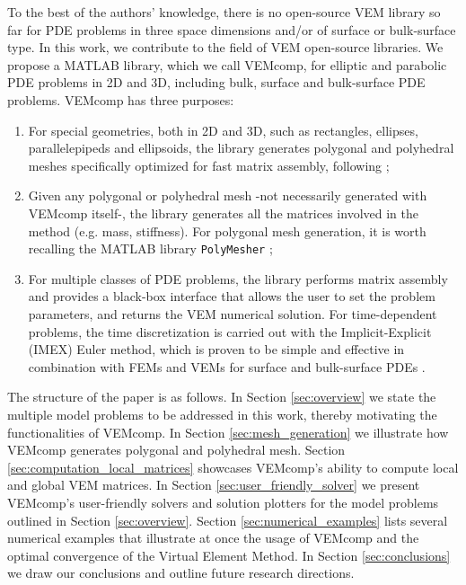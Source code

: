 \documentclass[a4paper]{article}
\begin{document}
{To the best of the authors' knowledge, there is no open-source VEM library so far for PDE problems in three space dimensions and/or of surface or bulk-surface type. In this work,  we contribute to the field of VEM open-source libraries. We propose a MATLAB library,  which we call VEMcomp, for elliptic and parabolic PDE problems in 2D and 3D, including bulk, surface and bulk-surface PDE problems.  VEMcomp has three purposes:
\begin{enumerate}
\item For special geometries, both in 2D and 3D, such as rectangles, ellipses, parallelepipeds and ellipsoids, the library generates polygonal and polyhedral meshes specifically optimized for fast matrix assembly, following \cite{frittelli2021bulk, frittelli2023bsrds};
\item Given any polygonal or polyhedral mesh -not necessarily generated with VEMcomp itself-, the library generates all the matrices involved in the method (e.g. mass, stiffness).  For polygonal mesh generation, it is worth recalling the MATLAB library \texttt{PolyMesher} \cite{Talischi_2012};
\item For multiple classes of PDE problems,  the library performs matrix assembly and provides a black-box interface that allows the user to set the problem parameters, and returns the VEM numerical solution. For time-dependent problems, the time discretization is carried out with the Implicit-Explicit (IMEX) Euler method,  which is proven to be simple and effective in combination with FEMs and VEMs for surface \cite{Frittelli2017preserving, Frittelli2017cross} and bulk-surface PDEs \cite{frittelli2021bulk, frittelli2023bsrds}.
\end{enumerate}
%
The structure of the paper is as follows. In Section \ref{sec:overview} we state the multiple model problems to be addressed in this work, thereby motivating the functionalities of VEMcomp.  In Section \ref{sec:mesh_generation} we illustrate how VEMcomp generates polygonal and polyhedral mesh. Section \ref{sec:computation_local_matrices} showcases VEMcomp's ability to compute local and global VEM matrices. In Section \ref{sec:user_friendly_solver} we present VEMcomp's user-friendly solvers and solution plotters for the model problems outlined in Section \ref{sec:overview}.  Section \ref{sec:numerical_examples} lists several numerical examples that illustrate at once the usage of VEMcomp and the optimal convergence of the Virtual Element Method. In Section \ref{sec:conclusions} we draw our conclusions and outline future research directions.}
\end{document}
